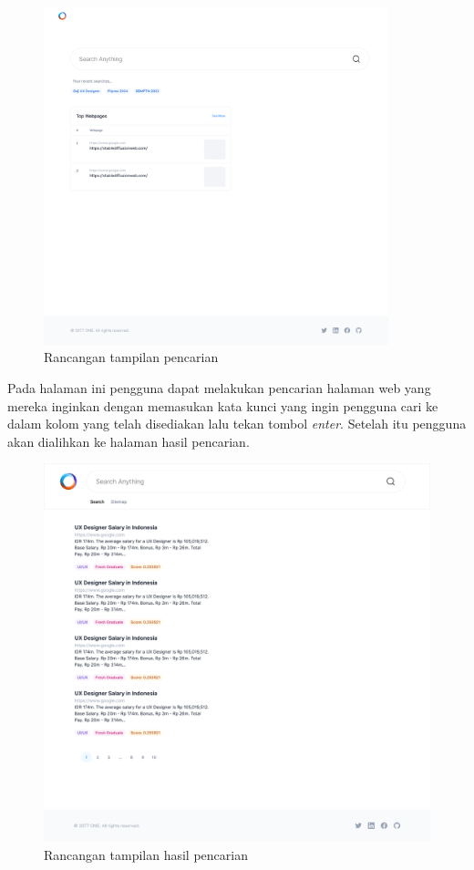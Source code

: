 \begin{enumerate}[label=\alph*)., leftmargin=1\parindent]
	
	\begin{figure}[H]
		\centering
		\includegraphics[keepaspectratio, width=10cm]{gambar/uiux_search.png}
		\caption{Rancangan tampilan pencarian}
		\label{gambar:uiux_search.png}
	\end{figure}

	Pada halaman ini pengguna dapat melakukan pencarian halaman web yang mereka inginkan dengan memasukan kata kunci yang ingin pengguna cari ke dalam kolom yang telah disediakan lalu tekan tombol \textit{enter}. Setelah itu pengguna akan dialihkan ke halaman hasil pencarian.
	
	
	
	\begin{figure}[H]
		\centering
		\includegraphics[keepaspectratio, width=15cm]{gambar/uiux_search_result.png}
		\caption{Rancangan tampilan hasil pencarian}
		\label{gambar:uiux_search_result.png}
	\end{figure}


\end{enumerate}
